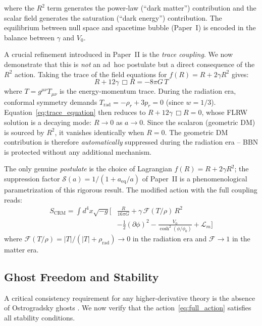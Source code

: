 \documentclass[aps,prd,twocolumn,superscriptaddress,nofootinbib]{revtex4-2}
\begin{document}
where the $R^2$ term generates the power-law (``dark matter'') contribution and the scalar field generates the saturation (``dark energy'') contribution. The equilibrium between null space and spacetime bubble (Paper~I) is encoded in the balance between $\gamma$ and $V_0$.

A crucial refinement introduced in Paper~II \cite{Geiger2026b} is the \textit{trace coupling}. We now demonstrate that this is \textit{not} an ad~hoc postulate but a direct consequence of the $R^2$ action. Taking the trace of the field equations for $f(R) = R + 2\gamma R^2$ gives:
\begin{equation}
R + 12\gamma\,\Box R = -8\pi G\,T
\label{eq:trace_equation}
\end{equation}
where $T = g^{\mu\nu}T_{\mu\nu}$ is the energy-momentum trace. During the radiation era, conformal symmetry demands $T_{\mathrm{rad}} = -\rho_r + 3p_r = 0$ (since $w = 1/3$). Equation~\eqref{eq:trace_equation} then reduces to $R + 12\gamma\,\Box R = 0$, whose FLRW solution is a decaying mode: $R \to 0$ as $a \to 0$. Since the scalaron (geometric DM) is sourced by $R^2$, it vanishes identically when $R = 0$. The geometric DM contribution is therefore \textit{automatically} suppressed during the radiation era -- BBN is protected without any additional mechanism.

The only genuine \textit{postulate} is the choice of Lagrangian $f(R) = R + 2\gamma R^2$; the suppression factor $\mathcal{S}(a) = 1/(1 + a_{\mathrm{eq}}/a)$ of Paper~II is a phenomenological parametrization of this rigorous result. The modified action with the full coupling reads:
\begin{equation}
\begin{split}
S_{\mathrm{CRM}} = \int d^4x \sqrt{-g} \Big[&\frac{R}{16\pi G} + \gamma\, \mathcal{F}(T/\rho)\, R^2 \\
&- \frac{1}{2}(\partial\phi)^2 - \frac{V_0}{\cosh^2(\phi/\phi_0)} + \mathcal{L}_m\Big]
\end{split}
\end{equation}
where $\mathcal{F}(T/\rho) = |T|/(|T| + \rho_{\mathrm{rad}}) \to 0$ in the radiation era and $\mathcal{F} \to 1$ in the matter era.

\subsection{Ghost Freedom and Stability}
\label{subsec:ghost_analysis}

A critical consistency requirement for any higher-derivative theory is the absence of Ostrogradsky ghosts \cite{Woodard2015}. We now verify that the action~\eqref{eq:full_action} satisfies all stability conditions.
\end{document}
